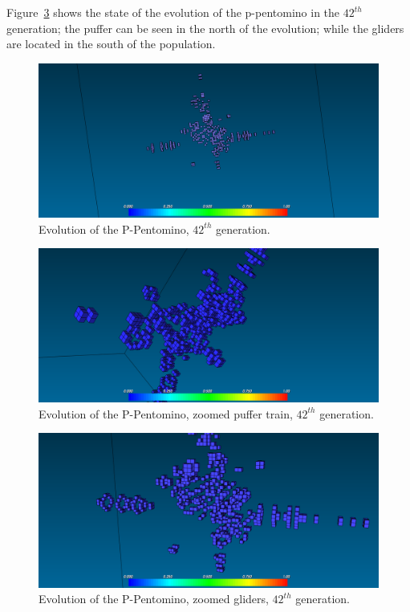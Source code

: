 Figure~\ref{fig:ss-pent:p-42} shows the state of the evolution of the
p-pentomino in the $42^{th}$ generation; the puffer can be seen in the north
of the evolution; while the gliders are located in the south of the population.

\begin{figure}
	\centering
	\includegraphics[scale=0.3]{pentominoes_ss/p_42.png}
	\caption{Evolution of the P-Pentomino, $42^{th}$ generation.}
  \label{fig:ss-pent:p-42}
\end{figure}

\begin{figure}
	\centering
	\includegraphics[scale=0.3]{pentominoes_ss/p_42_puffer.png}
	\caption{Evolution of the P-Pentomino, zoomed puffer train, $42^{th}$
	generation.}
  \label{fig:ss-pent:p-42}
\end{figure}

\begin{figure}
	\centering
	\includegraphics[scale=0.3]{pentominoes_ss/p_42_gliders.png}
	\caption{Evolution of the P-Pentomino, zoomed gliders, $42^{th}$ generation.}
  \label{fig:ss-pent:p-42}
\end{figure}


